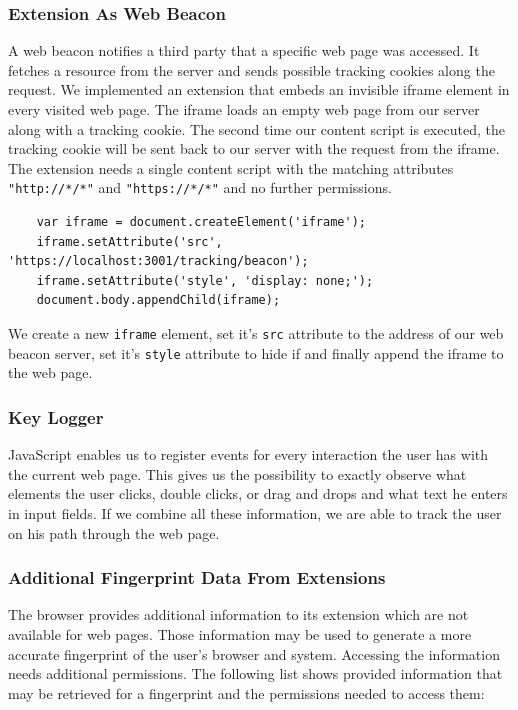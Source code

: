 	\subsubsection{Extension As Web Beacon}
	
	A web beacon notifies a third party that a specific web page was accessed. It fetches a resource from the server and sends possible tracking cookies along the request. We implemented an extension that embeds an invisible iframe element in every visited web page. The iframe loads an empty web page from our server along with a tracking cookie. The second time our content script is executed, the tracking cookie will be sent back to our server with the request from the iframe. The extension needs a single content script with the matching attributes \texttt{"http://*/*"} and \texttt{"https://*/*"} and no further permissions.
	
	\begin{lstlisting}
	var iframe = document.createElement('iframe');
	iframe.setAttribute('src', 'https://localhost:3001/tracking/beacon');
	iframe.setAttribute('style', 'display: none;');
	document.body.appendChild(iframe);
	\end{lstlisting}
	
	We create a new \texttt{iframe} element, set it's \texttt{src} attribute to the address of our web beacon server, set it's \texttt{style} attribute to hide if and finally append the iframe to the web page. 
	
	\subsubsection{Key Logger}
	
	JavaScript enables us to register events for every interaction the user has with the current web page. This gives us the possibility to exactly observe what elements the user clicks, double clicks, or drag and drops and what text he enters in input fields. If we combine all these information, we are able to track the user on his path through the web page. 
	
	
	\subsubsection{Additional Fingerprint Data From Extensions}
	
	The browser provides additional information to its extension which are not available for web pages. Those information may be used to generate a more accurate fingerprint of the user's browser and system. Accessing the information needs additional permissions. The following list shows provided information that may be retrieved for a fingerprint and the permissions needed to access them: \\
	
